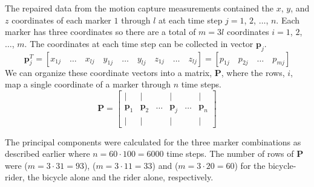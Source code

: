 \documentclass[smallextended]{svjour3}     %
\begin{document}
The repaired data from the motion capture measurements contained the $x$, $y$,
and $z$ coordinates of each marker $1$ through $l$ at each time step $j=1$,
$2$, $\ldots$, $n$. Each marker has three coordinates so there are a total of
$m=3l$ coordinates $i=1$, $2$, $\ldots$, $m$. The coordinates at each time step
can be collected in vector $\mathbf{p}_j$.
\begin{displaymath}
    \mathbf{p}_j^T
    =\left[x_{1j}\quad\ldots\quad x_{lj}\quad y_{1j}\quad\ldots\quad y_{lj}\quad z_{1j}\quad\ldots\quad z_{lj}\right]
    =\left[p_{1j}\quad p_{2j}\quad\ldots\quad    p_{mj}\right]
\end{displaymath}
We can organize these coordinate vectors into a matrix, $\mathbf{P}$, where the
rows, $i$, map a single coordinate of a marker through $n$ time steps.
\begin{displaymath}
\mathbf{P}=\left[ \begin{array}{cccccc}
|              & |              &        & |              &        & |             \\
\mathbf{p}_{1} & \mathbf{p}_{2} & \ldots & \mathbf{p}_{j} & \ldots & \mathbf{p}_{n}\\
|              & |              &        & |              &        & |
\end{array} \right]
\end{displaymath}

The principal components were calculated for the three marker combinations as
described earlier where $n=60\cdot100=6000$ time steps. The number of rows of
$\mathbf{P}$ were ($m=3\cdot31=93$), ($m=3\cdot11=33$) and ($m=3\cdot20=60$)
for the bicycle-rider, the bicycle alone and the rider alone, respectively.
\end{document}
